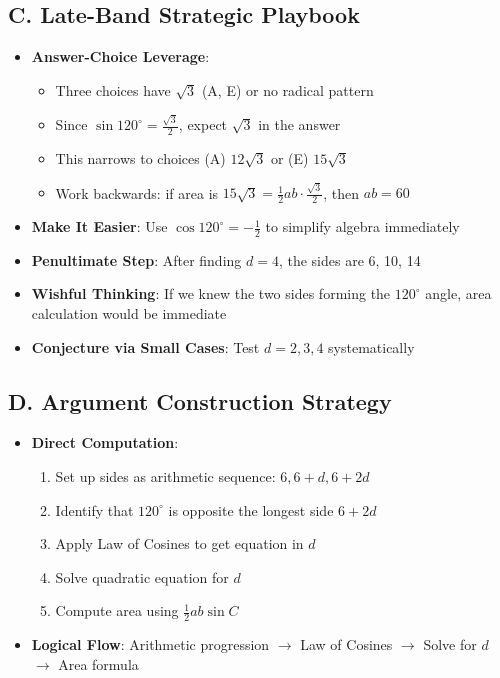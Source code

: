 \documentclass[12pt]{article}
\begin{document}
\begin{strategicbox}
\subsection*{C. Late-Band Strategic Playbook}
\begin{itemize}[leftmargin=*]
    \item \textbf{Answer-Choice Leverage}: 
    \begin{itemize}
        \item Three choices have $\sqrt{3}$ (A, E) or no radical pattern
        \item Since $\sin 120^\circ = \frac{\sqrt{3}}{2}$, expect $\sqrt{3}$ in the answer
        \item This narrows to choices (A) $12\sqrt{3}$ or (E) $15\sqrt{3}$
        \item Work backwards: if area is $15\sqrt{3} = \frac{1}{2}ab \cdot \frac{\sqrt{3}}{2}$, then $ab = 60$
    \end{itemize}
    \item \textbf{Make It Easier}: Use $\cos 120^\circ = -\frac{1}{2}$ to simplify algebra immediately
    \item \textbf{Penultimate Step}: After finding $d = 4$, the sides are 6, 10, 14
    \item \textbf{Wishful Thinking}: If we knew the two sides forming the $120^\circ$ angle, area calculation would be immediate
    \item \textbf{Conjecture via Small Cases}: Test $d = 2, 3, 4$ systematically
\end{itemize}

\subsection*{D. Argument Construction Strategy}
\begin{itemize}[leftmargin=*]
    \item \textbf{Direct Computation}: 
    \begin{enumerate}
        \item Set up sides as arithmetic sequence: $6, 6+d, 6+2d$
        \item Identify that $120^\circ$ is opposite the longest side $6+2d$
        \item Apply Law of Cosines to get equation in $d$
        \item Solve quadratic equation for $d$
        \item Compute area using $\frac{1}{2}ab\sin C$
    \end{enumerate}
    \item \textbf{Logical Flow}: Arithmetic progression $\to$ Law of Cosines $\to$ Solve for $d$ $\to$ Area formula
\end{itemize}


\end{strategicbox}
\end{document}
